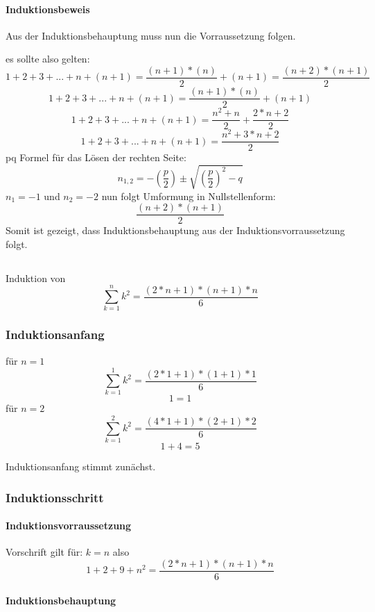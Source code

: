 \documentclass{article}
\begin{document}
\paragraph{Induktionsbeweis}\mbox{}

Aus der Induktionsbehauptung muss nun die Vorraussetzung folgen.

es sollte also gelten: \[1+2+3+...+n+(n+1) = \frac{(n+1)*(n)}{2}+(n+1) = \frac{(n+2)*(n+1)}{2}\]
\[1+2+3+...+n+(n+1) = \frac{(n+1)*(n)}{2}+(n+1) \]
\[1+2+3+...+n+(n+1) = \frac{n^2+n}{2}+ \frac{2*n+2}{2} \]
\[1+2+3+...+n+(n+1) = \frac{n^2+3*n+2}{2}\]
pq Formel für das Lösen der rechten Seite: \[n_{1,2} = -\left(\frac{p}{2}\right) \pm \sqrt{ \left(\frac{p}{2}\right)^{2}-q} \]
 $n_1=-1$ und  $n_2=-2$
 \newline
nun folgt Umformung in Nullstellenform:
\[\frac{(n+2)*(n+1)}{2} \]
\newline
Somit ist gezeigt, dass Induktionsbehauptung aus der Induktionsvorraussetzung folgt.

\subsection{}
Induktion von \[ \sum_{k=1}^{n}{k^2} = \frac{(2*n+1)*(n+1)*n}{6} \]
\subsubsection{Induktionsanfang}

für $n=1$
\[ \sum_{k=1}^{1}{k^2} = \frac{(2*1+1)*(1+1)*1}{6} \]
\[ 1 = 1 \]
\newline
für $n=2$
\[ \sum_{k=1}^{2}{k^2} = \frac{(4*1+1)*(2+1)*2}{6} \]
\[ 1+4 = 5 \]
\newline

Induktionsanfang stimmt zunächst.
\subsubsection{Induktionsschritt}
\paragraph{Induktionsvorraussetzung}\mbox{}

Vorschrift gilt für: $k=n$ also \[1+2+9+n^2 =\frac{(2*n+1)*(n+1)*n}{6} \]

\paragraph{Induktionsbehauptung}\mbox{}
\end{document}
